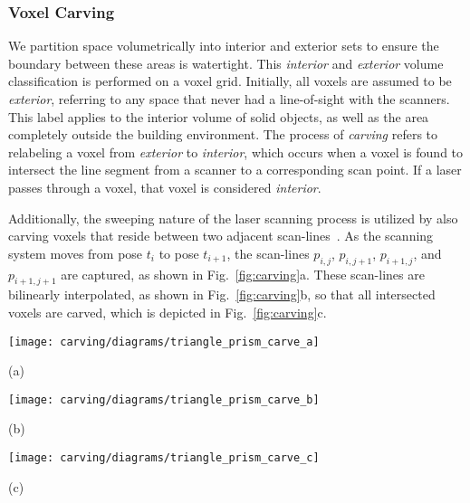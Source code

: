 \documentclass[journal]{IEEEtran}
\begin{document}
\subsubsection{Voxel Carving}
\label{sssec:voxel_carving}
We partition space volumetrically into interior and exterior sets to ensure the boundary between these areas is watertight.  This \textit{interior} and \textit{exterior} volume classification is performed on a voxel grid.  Initially, all voxels are assumed to be \textit{exterior}, referring to any space that never had a line-of-sight with the scanners.  This label applies to the interior volume of solid objects, as well as the area completely outside the building environment.  The process of \textit{carving} refers to relabeling a voxel from \textit{exterior} to \textit{interior}, which occurs when a voxel is found to intersect the line segment from a scanner to a corresponding scan point.  If a laser passes through a voxel, that voxel is considered \textit{interior}.

Additionally, the sweeping nature of the laser scanning process is utilized by also carving voxels that reside between two adjacent scan-lines~\cite{Turner13,Carving}.  As the scanning system moves from pose $t_i$ to pose $t_{i+1}$, the scan-lines $p_{i,j}$, $p_{i,j+1}$, $p_{i+1,j}$, and $p_{i+1,j+1}$ are captured, as shown in Fig.~\ref{fig:carving}a.  These scan-lines are bilinearly interpolated, as shown in Fig.~\ref{fig:carving}b, so that all intersected voxels are carved, which is depicted in Fig.~\ref{fig:carving}c.

\begin{figure*}[t]

  \begin{minipage}[b]{0.3\linewidth}
  \centerline{\texttt{[image: carving/diagrams/triangle\_prism\_carve\_a]}}
  \centerline{(a)}\medskip
  \end{minipage}
  \begin{minipage}[b]{0.3\linewidth}
  \centerline{\texttt{[image: carving/diagrams/triangle\_prism\_carve\_b]}}
  \centerline{(b)}\medskip
  \end{minipage}
  \begin{minipage}[b]{0.3\linewidth}
  \centerline{\texttt{[image: carving/diagrams/triangle\_prism\_carve\_c]}}
  \centerline{(c)}\medskip
  \end{minipage}

\caption{(a) The input point-cloud is used in conjunction with the track of each scanner to define interior space to carve; (b) carving is performed using ray-tracing from scanner location to an interpolation of the input points; (c) the result is a set of voxels labeled as {\it interior}.}
\label{fig:carving}
\end{figure*}
\end{document}
